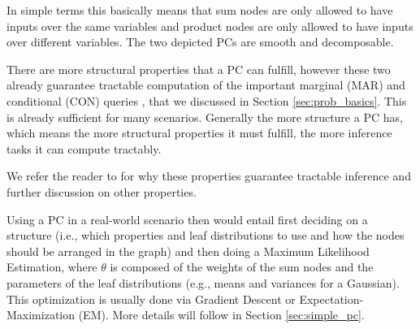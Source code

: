 In simple terms this basically means that sum nodes are only allowed to have inputs over the same variables and product nodes are
only allowed to have inputs over different variables. The two depicted PCs are smooth and decomposable.

There are more structural properties that a PC can fulfill, however these two already guarantee tractable computation of the important
marginal (MAR) and conditional (CON) queries \cite{pc_intro}, that we discussed in Section \ref{sec:prob_basics}. This is already sufficient for many scenarios. 
Generally the more structure a PC has, which means the more structural properties it must fulfill, the more inference tasks it can compute 
tractably. 

We refer the reader to \cite{pc_intro} for why these properties guarantee tractable inference 
and further discussion on other properties.

Using a PC in a real-world scenario then would entail first deciding on a structure (i.e., which properties and leaf 
distributions to use and how the nodes should be arranged in the graph) and then doing a Maximum Likelihood 
Estimation, where $\theta$ is composed of the weights of the sum nodes and the parameters of the leaf distributions (e.g., means and variances for a Gaussian). 
This optimization is usually done via Gradient Descent or Expectation-Maximization (EM). More details will follow in Section \ref{sec:simple_pc}.